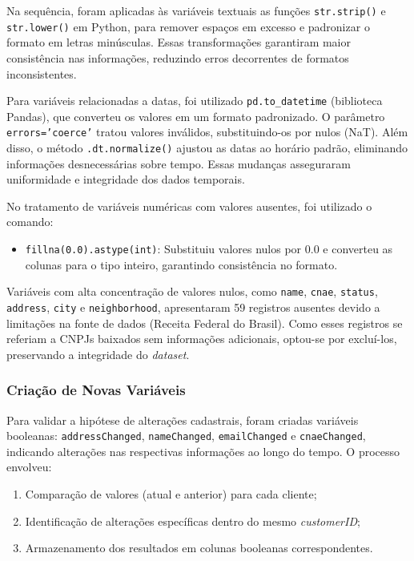 \documentclass[12pt,a4paper]{article}
\begin{document}
Na sequência, foram aplicadas às variáveis textuais as funções \texttt{str.strip()} e \texttt{str.lower()} em Python, para remover espaços em excesso e padronizar o formato em letras minúsculas. Essas transformações garantiram maior consistência nas informações, reduzindo erros decorrentes de formatos inconsistentes.

Para variáveis relacionadas a datas, foi utilizado \texttt{pd.to\_datetime} (biblioteca Pandas), que converteu os valores em um formato padronizado. O parâmetro \texttt{errors='coerce'} tratou valores inválidos, substituindo-os por nulos (NaT). Além disso, o método \texttt{.dt.normalize()} ajustou as datas ao horário padrão, eliminando informações desnecessárias sobre tempo. Essas mudanças asseguraram uniformidade e integridade dos dados temporais.

No tratamento de variáveis numéricas com valores ausentes, foi utilizado o comando:
\begin{itemize}
    \item \texttt{fillna(0.0).astype(int)}: Substituiu valores nulos por 0.0 e converteu as colunas para o tipo inteiro, garantindo consistência no formato.
\end{itemize}

Variáveis com alta concentração de valores nulos, como \texttt{name}, \texttt{cnae}, \texttt{status}, \texttt{address}, \texttt{city} e \texttt{neighborhood}, apresentaram 59 registros ausentes devido a limitações na fonte de dados (Receita Federal do Brasil). Como esses registros se referiam a CNPJs baixados sem informações adicionais, optou-se por excluí-los, preservando a integridade do \textit{dataset}.

\subsubsection{Criação de Novas Variáveis}

Para validar a hipótese de alterações cadastrais, foram criadas variáveis booleanas: \texttt{addressChanged}, \texttt{nameChanged}, \texttt{emailChanged} e \texttt{cnaeChanged}, indicando alterações nas respectivas informações ao longo do tempo. O processo envolveu:
\begin{enumerate}
    \item Comparação de valores (atual e anterior) para cada cliente;
    \item Identificação de alterações específicas dentro do mesmo \textit{customerID};
    \item Armazenamento dos resultados em colunas booleanas correspondentes.
\end{enumerate}
\end{document}
